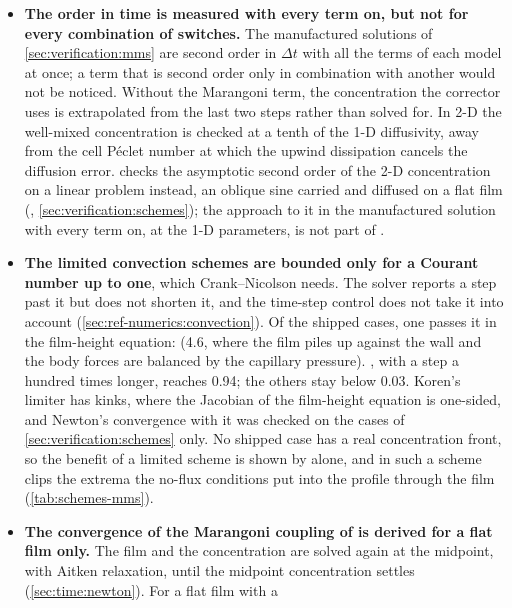 \begin{itemize}
  \item \textbf{The order in time is measured with every term on, but not
    for every combination of switches.} The manufactured solutions of
    \cref{sec:verification:mms} are second order in $\Delta t$ with all the
    terms of each model at once; a term that is second order only in
    combination with another would not be noticed. Without the Marangoni
    term, the concentration the  corrector uses is extrapolated
    from the last two steps rather than solved for. In 2-D the well-mixed
    concentration is checked at a tenth of the 1-D diffusivity, away from
    the cell Péclet number at which the upwind dissipation cancels the
    diffusion error.  checks the asymptotic second order of the
    2-D concentration on a linear problem instead, an oblique sine carried
    and diffused on a flat film (,
    \cref{sec:verification:schemes}); the approach to it in the
    manufactured solution with every term on, at the 1-D parameters, is not
    part of .
  \item \textbf{The limited convection schemes are bounded only for a
    Courant number up to one}, which Crank--Nicolson needs. The solver
    reports a step past it but does not shorten it, and the time-step
    control does not take it into account
    (\cref{sec:ref-numerics:convection}). Of the shipped cases, one passes
    it in the film-height equation:  (4.6, where
    the film piles up against the wall and the body forces are balanced by
    the capillary pressure). , with a step a hundred times
    longer, reaches 0.94; the others stay below 0.03. Koren's limiter has
    kinks, where the Jacobian of the film-height equation is one-sided, and
    Newton's convergence with it was checked on the cases of
    \cref{sec:verification:schemes} only. No shipped case has a real
    concentration front, so the benefit of a limited 
    scheme is shown by  alone, and in  such
    a scheme clips the extrema the no-flux conditions put into the profile
    through the film (\cref{tab:schemes-mms}).
  \item \textbf{The convergence of the Marangoni coupling of  is
    derived for a flat film only.} The film and the concentration are solved
    again at the midpoint, with Aitken relaxation, until the midpoint
    concentration settles (\cref{sec:time:newton}). For a flat film with a

\end{itemize}
